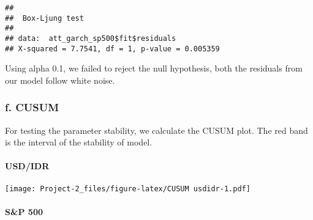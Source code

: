 \documentclass[]{article}
\newenvironment{Shaded}{\begin{snugshade}}{\end{snugshade}}
\newcommand{\KeywordTok}[1]{\textcolor[rgb]{0.13,0.29,0.53}{\textbf{#1}}}
\newcommand{\DataTypeTok}[1]{\textcolor[rgb]{0.13,0.29,0.53}{#1}}
\newcommand{\DecValTok}[1]{\textcolor[rgb]{0.00,0.00,0.81}{#1}}
\newcommand{\StringTok}[1]{\textcolor[rgb]{0.31,0.60,0.02}{#1}}
\newcommand{\OperatorTok}[1]{\textcolor[rgb]{0.81,0.36,0.00}{\textbf{#1}}}
\newcommand{\NormalTok}[1]{#1}
\let\oldparagraph\paragraph
\renewcommand{\paragraph}[1]{\oldparagraph{#1}\mbox{}}
\begin{document}
\begin{Shaded}
\end{Shaded}

\begin{verbatim}
## 
##  Box-Ljung test
## 
## data:  att_garch_sp500$fit$residuals
## X-squared = 7.7541, df = 1, p-value = 0.005359
\end{verbatim}

Using alpha 0.1, we failed to reject the null hypothesis, both the
residuals from our model follow white noise.

\subsubsection{f. CUSUM}\label{f.-cusum}

For testing the parameter stability, we calculate the CUSUM plot. The
red band is the interval of the stability of model.

\paragraph{USD/IDR}\label{usdidr}

\begin{Shaded}
\end{Shaded}

\texttt{[image: Project-2\_files/figure-latex/CUSUM usdidr-1.pdf]}

\paragraph{S\&P 500}\label{sp-500}

\begin{Shaded}
\end{Shaded}
\end{document}
